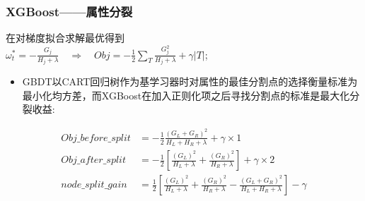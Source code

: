 \documentclass[usenames,dvipsnames]{beamer}
\begin{document}
\begin{frame}
\frametitle{XGBoost——属性分裂}
在对梯度拟合求解最优得到 \\
\quad \quad \quad $\omega_t^{*} = -\frac{G_j}{H_j + \lambda}\quad\Rightarrow\quad 
Obj = -\frac{1}{2}\sum_{T}\frac{G_j^2}{H_j+\lambda}+\gamma |T|$;
\begin{itemize}
  \item GBDT以CART回归树作为基学习器时对属性的最佳分割点的选择衡量标准为最小化均方差，而XGBoost在加入正则化项之后寻找分割点的标准是最大化分裂收益:
\end{itemize}
\begin{align*}
  Obj\_before\_split & = -\frac{1}{2}\frac{(G_L+G_R)^2}{H_L+H_R+\lambda}+\gamma \times 1\\
  Obj\_after\_split & = -\frac{1}{2}[\frac{(G_L)^2}{H_L+\lambda}+\frac{(G_R)^2}{H_R+\lambda}]+\gamma \times 2\\
  node\_split\_gain & = \frac{1}{2}[\frac{(G_L)^2}{H_L+\lambda}+\frac{(G_R)^2}{H_R+\lambda}- \frac{(G_L+G_R)^2}{H_L+H_R+\lambda}]-\gamma
\end{align*}
\end{frame}
\end{document}
